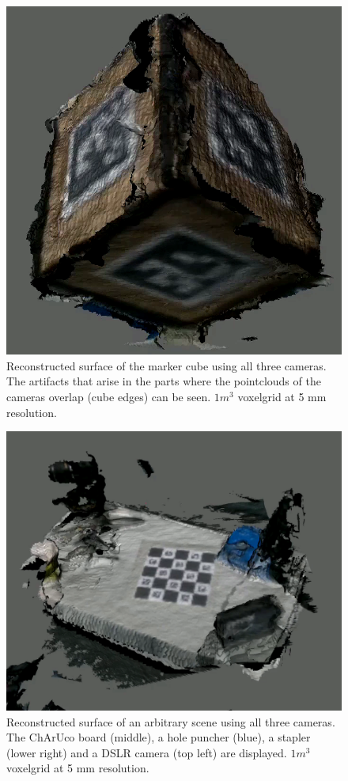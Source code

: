 \documentclass[10pt,twocolumn,letterpaper]{article}
\begin{document}
\begin{figure}[h!]
	\begin{center}
		\includegraphics[width=0.9\linewidth]{imgs/cube_reconstructed.png}
	\end{center}
	\caption{Reconstructed surface of the marker cube using all three cameras. The artifacts that arise in the parts where the pointclouds of the cameras overlap (cube edges) can be seen. $1m^3$ voxelgrid at 5 mm resolution.}
	\label{fig:scene-1}
\end{figure}

\begin{figure}[h!]
	\begin{center}
		\includegraphics[width=0.9\linewidth]{imgs/scene.png}
	\end{center}
	\caption{Reconstructed surface of an arbitrary scene using all three cameras. The ChArUco board (middle), a hole puncher (blue), a stapler (lower right) and a DSLR camera (top left) are displayed. $1m^3$ voxelgrid at 5 mm resolution.}
	\label{fig:scene-2}
\end{figure}

\clearpage

{\small


}
\end{document}
